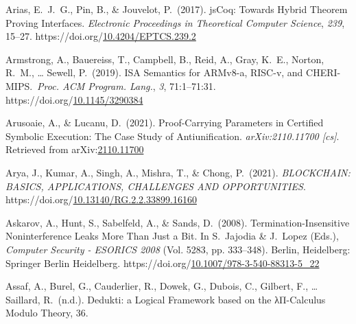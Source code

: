 \documentclass[12pt,twoside]{article}
\begin{document}
{\begin{thebibliography}{1079}
\mdbibitemlabel{}Arias, E.~J.~G., Pin, B., \& Jouvelot, P.~(2017). jsCoq: Towards Hybrid Theorem Proving Interfaces. \emph{Electronic Proceedings in Theoretical Computer Science}, \emph{239}, 15–27. https://doi.org/\href{https://dx.doi.org/10.4204/EPTCS.239.2}{10.4204/EPTCS.239.2}%

\mdbibitemlabel{}Armstrong, A., Bauereiss, T., Campbell, B., Reid, A., Gray, K.~E., Norton, R.~M., … Sewell, P.~(2019). ISA Semantics for ARMv8-a, RISC-v, and CHERI-MIPS.~\emph{Proc. ACM Program. Lang.}, \emph{3}, 71:1–71:31. https://doi.org/\href{https://dx.doi.org/10.1145/3290384}{10.1145/3290384}%

\mdbibitemlabel{}Arusoaie, A., \& Lucanu, D.~(2021). Proof-Carrying Parameters in Certified Symbolic Execution: The Case Study of Antiunification. \emph{arXiv:2110.11700 {}[cs]}. Retrieved from arXiv:\href{http://arxiv.org/abs/2110.11700}{2110.11700}%

\mdbibitemlabel{}Arya, J., Kumar, A., Singh, A., Mishra, T., \& Chong, P.~(2021). \emph{BLOCKCHAIN: BASICS, APPLICATIONS, CHALLENGES AND OPPORTUNITIES}. https://doi.org/\href{https://dx.doi.org/10.13140/RG.2.2.33899.16160}{10.13140/RG.2.2.33899.16160}%

\mdbibitemlabel{}Askarov, A., Hunt, S., Sabelfeld, A., \& Sands, D.~(2008). Termination-Insensitive Noninterference Leaks More Than Just a Bit. In S.~Jajodia \& J.~Lopez (Eds.), \emph{Computer Security - ESORICS 2008} (Vol. 5283, pp. 333–348). Berlin, Heidelberg: Springer Berlin Heidelberg. https://doi.org/\href{https://dx.doi.org/10.1007/978-3-540-88313-5_22}{10.1007/978-3-540-88313-5\_22}%

\mdbibitemlabel{}Assaf, A., Burel, G., Cauderlier, R., Dowek, G., Dubois, C., Gilbert, F., … Saillard, R.~(n.d.). Dedukti: a Logical Framework based on the λΠ-Calculus Modulo Theory, 36.%


\end{thebibliography}}
\end{document}
